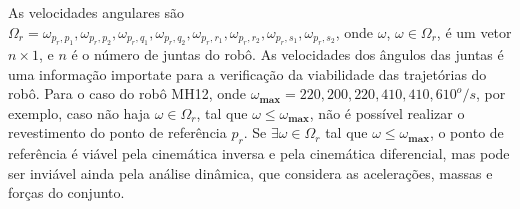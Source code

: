 As velocidades angulares são $\Omega_r
=
{\omega_{p_r,p_1},\omega_{p_r,p_2},\omega_{p_r,q_1},\omega_{p_r,q_2},\omega_{p_r,r_1},\omega_{p_r,r_2},\omega_{p_r,s_1},\omega_{p_r,s_2}}$,
onde $\omega$, $\omega\in\Omega_r$, é um vetor $n \times 1$, e $n$ é o número de
juntas do robô. As velocidades dos ângulos das juntas é uma informação importate para a
verificação da viabilidade das trajetórias do robô. Para o caso do robô
MH12, onde $\omega_{\textbf{max}}={220, 200, 220, 410, 410, 610}^o/s$, por
exemplo, caso não haja $\omega\in\Omega_r$, tal que
$\omega\leq\omega_{\textbf{max}}$, não é possível realizar o revestimento do
ponto de referência $p_r$. Se $\exists \omega\in\Omega_r$ tal que
$\omega\leq\omega_{\textbf{max}}$, o ponto de referência é viável pela
cinemática inversa e pela cinemática diferencial, mas pode ser inviável ainda
pela análise dinâmica, que considera as acelerações, massas e forças do
conjunto.
